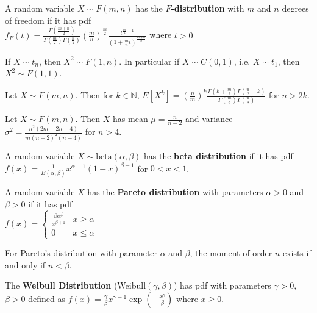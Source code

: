 \begin{defn}
    A random variable $X \sim F(m,n)$ has the \textbf{$F$-distribution} with $m$ and $n$ degrees of freedom if it has pdf \\ 
    $ f_F(t) = \displaystyle \frac{\Gamma\left(\frac{m + n}{2} \right)}{\Gamma\left(\frac{m}{2} \right) \Gamma\left(\frac{n}{2} \right)} \displaystyle \left(\frac{m}{n}\right)^{\frac{m}{2}} \frac{t^{\frac{m}{2} - 1}}{(1 + \frac{m}{n}t)^{\frac{m + n}{2}}} $ where $t > 0$
\end{defn}

\begin{prop}
    If $X \sim t_n$, then $X^2 \sim F(1,n)$. In particular if $X \sim C(0,1)$, i.e. $X \sim t_1$, then $X^2 \sim F(1,1)$.
\end{prop}

\begin{prop}
    Let $X \sim F(m,n)$. Then for $k \in \mathbb{N}$, $E[X^k] =\displaystyle \left(\frac{n}{m}\right)^k \frac{\Gamma(k + \frac{m}{2}) \Gamma(\frac{n}{2} - k)}{\Gamma(\frac{m}{2}) \Gamma(\frac{n}{2})}$ for $n > 2k$.
\end{prop}

\begin{prop}
    Let $X \sim F(m,n)$. Then $X$ has mean $\mu = \displaystyle \frac{n}{n-2}$ and variance $\sigma^2 = \displaystyle \frac{n^2 (2m + 2n - 4)}{m (n-2)^2 (n-4)}$ for $n > 4$.
\end{prop}

\begin{defn}
    A random variable $X \sim \text{beta}(\alpha, \beta)$ has the \textbf{beta distribution} if it has pdf \\
    $ f(x) = \displaystyle \frac{1}{B(\alpha, \beta)} x^{\alpha-1} (1-x)^{\beta - 1}$ for $0 < x < 1$.
\end{defn}

\begin{defn}
    A random variable $X$ has the \textbf{Pareto distribution} with parameters $\alpha > 0$ and $\beta > 0$ if it has pdf \\
    $f(x) = \begin{cases} \displaystyle \frac{\beta \alpha^\beta}{x^{\beta + 1}} & x \geq \alpha \\ 0 & x \leq \alpha \end{cases}$
\end{defn}

\begin{prop}
    For Pareto's distribution with parameter $\alpha$ and $\beta$, the moment of order $n$ exists if and only if $n < \beta$. 
\end{prop}

\begin{defn}
    The \textbf{Weibull Distribution} (Weibull$(\gamma, \beta)$) has pdf with parameters $\gamma > 0$, $\beta > 0$ defined as  $f(x) = \frac{\gamma}{\beta} x^{\gamma - 1} \exp(- \frac{x^\gamma}{\beta})$ where $x \geq 0$.
\end{defn}

\hhrule
